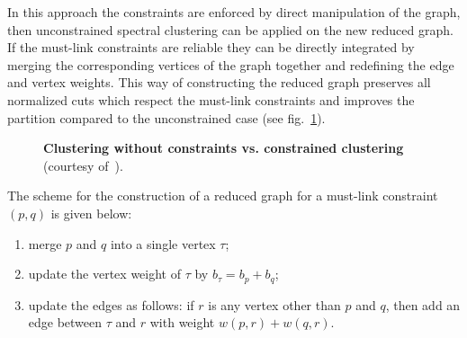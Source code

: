 In this approach the constraints are enforced by direct manipulation of the graph, then unconstrained spectral clustering can be applied
on the new reduced graph. If the must-link constraints are reliable they can be directly integrated by merging the corresponding vertices of the graph together and redefining the edge and vertex weights. This way of constructing 
the reduced graph preserves all normalized cuts which respect the must-link constraints and improves the partition compared to the unconstrained case (see fig.~\ref{fig:cosc}).
\begin{figure}[htbp]
\centering
{}
\caption[Clustering without constraints vs. constrained clustering]{
 {\bf Clustering without constraints vs. constrained clustering} (courtesy of~\cite{Hein13}).}
\label{fig:cosc}
\end{figure}

The scheme for the construction of a reduced graph for a must-link constraint $(p,q)$ is given below:
\begin{enumerate}
 \item merge $p$ and $q$ into a single vertex $\tau$;
\item update the vertex weight of $\tau$ by $b_{\tau} = b_p+b_q$;
\item update the edges as follows: if $r$ is any vertex other than $p$ and $q$, then add an edge between $\tau$ and $r$ with weight $w(p,r)+w(q,r)$.
\end{enumerate}

